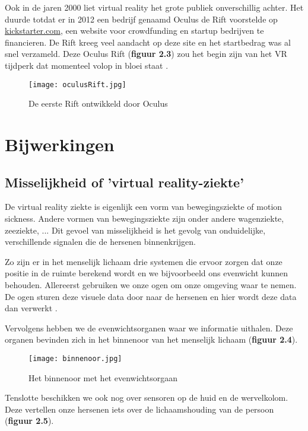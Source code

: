 Ook in de jaren 2000 liet virtual reality het grote publiek onverschillig achter. Het duurde totdat er in 2012 een bedrijf genaamd Oculus de Rift voorstelde op \href{https://www.kickstarter.com/}{kickstarter.com}, een website voor crowdfunding en startup bedrijven te financieren. De Rift kreeg veel aandacht op deze site en het startbedrag was al snel verzameld. Deze Oculus Rift (\textbf{figuur 2.3}) zou het begin zijn van het VR tijdperk dat momenteel volop in bloei staat \autocite{Society2019}.

\begin{figure}[h]
    \centering
    \texttt{[image: oculusRift.jpg]}
    \caption{De eerste Rift ontwikkeld door Oculus \autocite{Kumparak2014}}
\end{figure}

\section{Bijwerkingen}
\subsection{Misselijkheid of 'virtual reality-ziekte'}

De virtual reality ziekte is eigenlijk een vorm van bewegingsziekte of motion sickness. Andere vormen van bewegingsziekte zijn onder andere wagenziekte, zeeziekte, ... Dit gevoel van misselijkheid is het gevolg van onduidelijke, verschillende signalen die de hersenen binnenkrijgen.

Zo zijn er in het menselijk lichaam drie systemen die ervoor zorgen dat onze positie in de ruimte berekend wordt en we bijvoorbeeld ons evenwicht kunnen behouden.
Allereerst gebruiken we onze ogen om onze omgeving waar te nemen. De ogen sturen deze visuele data door naar de hersenen en hier wordt deze data dan verwerkt \autocite{Bovenij2019}.

Vervolgens hebben we de evenwichtsorganen waar we informatie uithalen. Deze organen bevinden zich in het binnenoor van het menselijk lichaam (\textbf{figuur 2.4}).

\begin{figure}[h]
    \centering
    \texttt{[image: binnenoor.jpg]}
    \caption{Het binnenoor met het evenwichtsorgaan \autocite{Utrecht2019}}
\end{figure}

Tenslotte beschikken we ook nog over sensoren op de huid en de wervelkolom. Deze vertellen onze hersenen iets over de lichaamshouding van de persoon (\textbf{figuur 2.5}).

